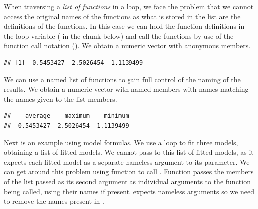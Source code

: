 \documentclass[krantz2]{krantz}\usepackage{knitr}
\begin{document}
When traversing a \emph{list of functions} in a loop, we face the problem that we cannot access the original names of the functions as what is stored in the list are the definitions of the functions. In this case we can hold the function definitions in the loop variable ( in the chunk below) and call the functions by use of the function call notation (). We obtain a numeric vector with anonymous members.

\begin{knitrout}\footnotesize
{}\color{fgcolor}\begin{kframe}
\begin{alltt}
 \hlkwb{<-} \hlstd{()}
 \hlkwb{<-} 
   
    \hlkwb{<-}  
   \hlstd{\}}
\end{alltt}
\begin{verbatim}
## [1]  0.5453427  2.5026454 -1.1139499
\end{verbatim}
\end{kframe}
\end{knitrout}

We can use a named list of functions to gain full control of the naming of the results. We obtain a numeric vector with named members with names matching the names given to the list members.

\begin{knitrout}\footnotesize
{}\color{fgcolor}\begin{kframe}
\begin{alltt}
 \hlkwb{<-} \hlstd{()}
 \hlkwb{<-} \hlstd{(}     
   
    \hlkwb{<-} 
   \hlstd{\}}
\end{alltt}
\begin{verbatim}
##    average    maximum    minimum 
##  0.5453427  2.5026454 -1.1139499
\end{verbatim}
\end{kframe}
\end{knitrout}

Next is an example using model formulas. We use a loop to fit three models, obtaining a list of fitted models. We cannot pass to  this list of fitted models, as it expects each fitted model as a separate nameless argument to its \code{\ldots} parameter. We can get around this problem using function  to call . Function  passes the members of the list passed as its second argument as individual arguments to the function being called, using their names if present.  expects nameless arguments so we need to remove the names present in .
\end{document}
